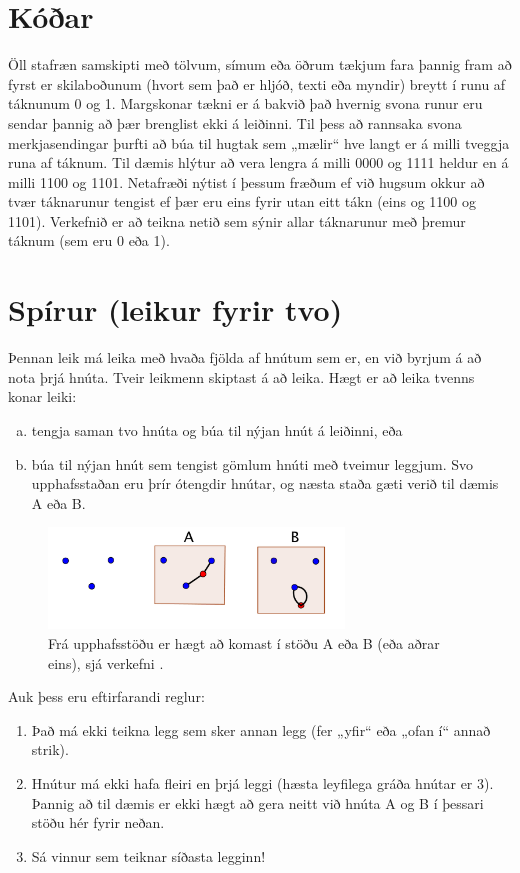 \documentclass[b5paper,12pt]{book}
\renewcommand*\thesection{\arabic{section}}
\begin{document}
\section{Kóðar}
Öll stafræn samskipti með tölvum, símum eða öðrum tækjum fara þannig fram að fyrst er skilaboðunum (hvort sem það er hljóð, texti eða myndir) breytt í runu af táknunum 0 og 1. Margskonar tækni er á bakvið það hvernig svona runur eru sendar þannig að þær brenglist ekki á leiðinni. Til þess að rannsaka svona merkjasendingar þurfti að búa til hugtak sem „mælir“ hve langt er á milli tveggja runa af táknum. Til dæmis hlýtur að vera lengra á milli 0000 og 1111 heldur en á milli 1100 og 1101. Netafræði nýtist í þessum fræðum ef við hugsum okkur að tvær táknarunur tengist ef þær eru eins fyrir utan eitt tákn (eins og 1100 og 1101). Verkefnið er að teikna netið sem sýnir allar táknarunur með þremur táknum (sem eru 0 eða 1).

\section{Spírur (leikur fyrir tvo)}
Þennan leik má leika með hvaða fjölda af hnútum sem er, en við byrjum á að nota þrjá hnúta. Tveir leikmenn skiptast á að leika. Hægt er að leika tvenns konar leiki:
\begin{enumerate}[(a)]
\item tengja saman tvo hnúta og búa til nýjan hnút á leiðinni, eða
\item búa til nýjan hnút sem tengist gömlum hnúti með tveimur leggjum.
Svo upphafsstaðan eru þrír ótengdir hnútar, og næsta staða gæti verið til dæmis A eða B.
\end{enumerate}

\begin{figure}[h]
  \includegraphics[width=0.7\textwidth, center]{Myndir/Sprouts1.png}
  \caption*{Frá upphafsstöðu er hægt að komast í stöðu A eða B (eða aðrar eins), sjá verkefni \thesection{}.}
\end{figure}

Auk þess eru eftirfarandi reglur: 
\begin{enumerate}
\item Það má ekki teikna legg sem sker annan legg (fer „yfir“ eða „ofan í“ annað strik). 
\item Hnútur má ekki hafa fleiri en þrjá leggi (hæsta leyfilega gráða hnútar er 3). Þannig að til dæmis er ekki hægt að gera neitt við hnúta A og B í þessari stöðu hér fyrir neðan.
\item Sá vinnur sem teiknar síðasta legginn!
\end{enumerate}
\end{document}
